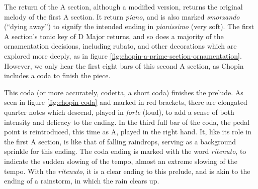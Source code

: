The return of the A section, although a modified version, returns the original melody of the first A section. It return \textit{piano}, and is also marked \textit{smorzando} (``dying away'') to signify the intended ending in \textit{pianissimo} (very soft). The first A section's tonic key of D\musFlat{} Major returns, and so does a majority of the ornamentation decisions, including rubato, and other decorations which are explored more deeply, as in figure \ref{fig:chopin-a-prime-section-ornamentation}\autocite{Hansen_1973}. However, we only hear the first eight bars of this second A section, as Chopin includes a coda to finish the piece.

This coda (or more accurately, codetta, a short coda) finishes the prelude. As seen in figure \ref{fig:chopin-coda}\autocite{Hansen_1973} and marked in red brackets, there are elongated quarter notes which descend, played in \textit{forte} (loud), to add a sense of both intensity and delicacy to the ending. In the third full bar of the coda, the pedal point is reintroduced, this time as A\musFlat{}, played in the right hand. It, like its role in the first A section, is like that of falling raindrops, serving as a background sprinkle for this ending. The coda ending is marked with the word \textit{ritenuto}\autocite{Cole_Schwartz_Ritenuto}, to indicate the sudden slowing of the tempo, almost an extreme slowing of the tempo. With the \textit{ritenuto}, it is a clear ending to this prelude, and is akin to the ending of a rainstorm, in which the rain clears up.